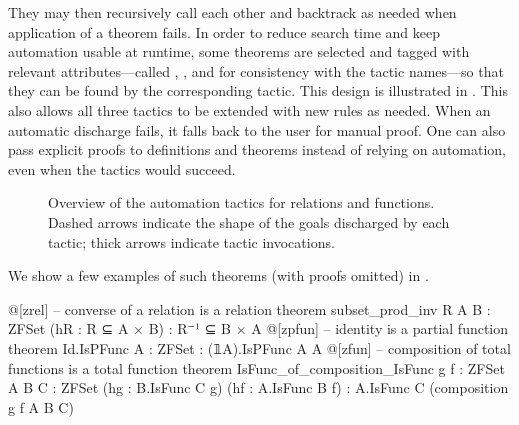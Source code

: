 They may then recursively call each other and backtrack as needed when application of a theorem fails.
In order to reduce search time and keep automation usable at runtime, some theorems are selected and tagged with relevant attributes---called , , and  for consistency with the tactic names---so that they can be found by the corresponding tactic.
This design is illustrated in .
This also allows all three tactics to be extended with new rules as needed.
When an automatic discharge fails, it falls back to the user for manual proof.
One can also pass explicit proofs to definitions and theorems instead of relying on automation, even when the tactics would succeed.
%
\begin{figure}[t]
  \centering
  \caption{Overview of the automation tactics for relations and functions. Dashed arrows indicate the shape of the goals discharged by each tactic; thick arrows indicate tactic invocations.}
  \label{fig:tactics}
\end{figure}
%
We show a few examples of such theorems (with proofs omitted) in .
\begin{leanlisting}[title={Examples of theorems tagged for automation.}, label=lst:automation-layer-thm, float=t]
@[zrel] -- converse of a relation is a relation
theorem subset_prod_inv {R A B : ZFSet} (hR : R ⊆ A × B) : R⁻¹ ⊆ B × A
@[zpfun] -- identity is a partial function
theorem Id.IsPFunc {A : ZFSet} : (𝟙A).IsPFunc A A
@[zfun] -- composition of total functions is a total function
theorem IsFunc_of_composition_IsFunc {g f : ZFSet} {A B C : ZFSet}
  (hg : B.IsFunc C g) (hf : A.IsFunc B f) :
    A.IsFunc C (composition g f A B C)
\end{leanlisting}

